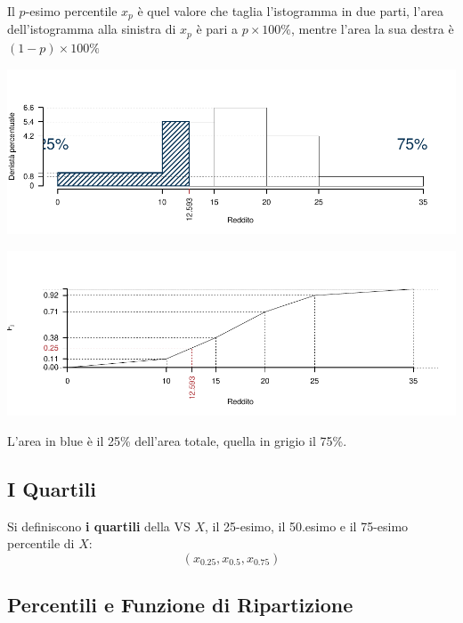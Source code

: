 \documentclass[
  11pt,
]{book}
\theoremstyle{mytheoremstyle}
\theoremstyle{mydefstyle}
\newenvironment{nota}
  {
\begin{tcolorbox}[enhanced,breakable,arc=0.1mm,boxrule=1pt,colback=white,colframe=iblue,title=\bf \fontfamily{lmss}\selectfont \faInfoCircle \hspace{.5 cm} Nota,drop fuzzy shadow]
}{
\end{tcolorbox}
  }
\begin{document}
\begin{nota}
Il \(p\)-esimo percentile \(x_p\) è quel valore che taglia l'istogramma in due parti, l'area dell'istogramma alla sinistra di \(x_p\) è pari a \(p\times 100\%\), mentre l'area la sua destra è \((1-p)\times 100\%\)

\begin{center}\includegraphics{Appunti_di_Statistica_2025_files/figure-latex/04-mediana-percentili-9-1} \end{center}

\begin{center}\includegraphics{Appunti_di_Statistica_2025_files/figure-latex/04-mediana-percentili-9-2} \end{center}

L'area in blue è il 25\% dell'area totale, quella in grigio il 75\%.

\end{nota}

\subsection{I Quartili}\label{i-quartili}

Si definiscono \textbf{i quartili} della VS \(X\), il 25-esimo, il 50.esimo e il 75-esimo percentile di \(X\):
\[
(x_{0.25},x_{0.5},x_{0.75})
\]

\subsection{Percentili e Funzione di Ripartizione}\label{percentili-e-funzione-di-ripartizione}
\end{document}
